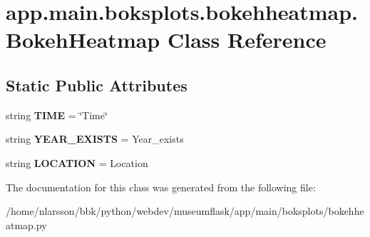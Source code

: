 \hypertarget{classapp_1_1main_1_1boksplots_1_1bokehheatmap_1_1BokehHeatmap}{}\section{app.\+main.\+boksplots.\+bokehheatmap.\+Bokeh\+Heatmap Class Reference}
\label{classapp_1_1main_1_1boksplots_1_1bokehheatmap_1_1BokehHeatmap}
\subsection*{Static Public Attributes}
\begin{DoxyCompactItemize}
\item 
\mbox{\label{classapp_1_1main_1_1boksplots_1_1bokehheatmap_1_1BokehHeatmap_a7067a9762c93987006c0cd83ae6636a2}} 
string {\bfseries T\+I\+ME} = \char`\"{}Time\char`\"{}
\item 
\mbox{\label{classapp_1_1main_1_1boksplots_1_1bokehheatmap_1_1BokehHeatmap_a12c5d9227ec1b35a4d50ed14416f30af}} 
string {\bfseries Y\+E\+A\+R\+\_\+\+E\+X\+I\+S\+TS} = \textquotesingle{}Year\+\_\+exists\textquotesingle{}
\item 
\mbox{\label{classapp_1_1main_1_1boksplots_1_1bokehheatmap_1_1BokehHeatmap_ad5340fe7893e1f24c43afc5008f445db}} 
string {\bfseries L\+O\+C\+A\+T\+I\+ON} = \textquotesingle{}Location\textquotesingle{}
\end{DoxyCompactItemize}


The documentation for this class was generated from the following file\+:\begin{DoxyCompactItemize}
\item 
/home/nlarsson/bbk/python/webdev/museumflask/app/main/boksplots/bokehheatmap.\+py\end{DoxyCompactItemize}
